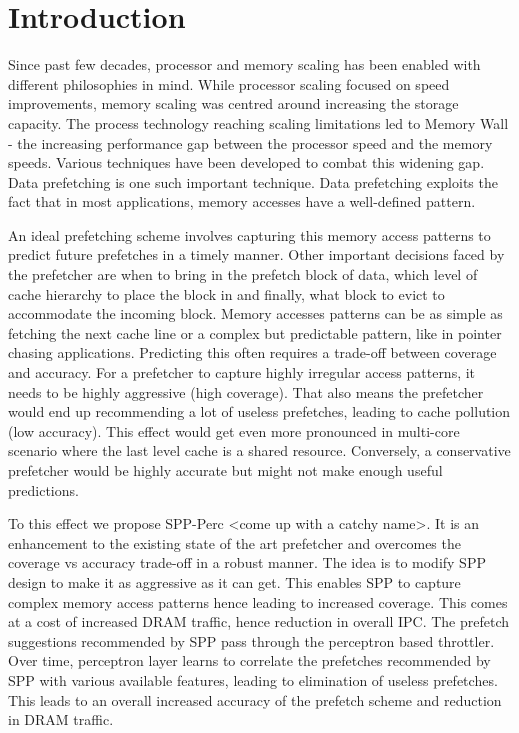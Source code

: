 \section{Introduction}
Since past few decades, processor and memory scaling has been enabled
with different philosophies in mind.  While processor scaling focused
on speed improvements, memory scaling was centred around increasing
the storage capacity.  The process technology reaching scaling
limitations led to Memory Wall\cite{MemWall} - the increasing
performance gap between the processor speed and the memory speeds.
Various techniques have been developed to combat this widening gap.
Data prefetching is one such important technique.  Data prefetching
exploits the fact that in most applications, memory accesses have a
well-defined pattern.

An ideal prefetching scheme involves capturing this memory access
patterns to predict future prefetches in a timely manner.  Other
important decisions faced by the prefetcher are when to bring in the
prefetch block of data, which level of cache hierarchy to place the
block in and finally, what block to evict to accommodate the incoming
block.  Memory accesses patterns can be as simple as fetching the next
cache line or a complex but predictable pattern, like in pointer
chasing applications.  Predicting this often requires a trade-off
between coverage and accuracy.  For a prefetcher to capture highly
irregular access patterns, it needs to be highly aggressive (high
coverage).  That also means the prefetcher would end up recommending a
lot of useless prefetches, leading to cache pollution (low accuracy).
This effect would get even more pronounced in multi-core scenario
where the last level cache is a shared resource.  Conversely, a
conservative prefetcher would be highly accurate but might not make
enough useful predictions.

To this effect we propose SPP-Perc <come up with a catchy name>.  It
is an enhancement to the existing state of the art prefetcher and
overcomes the coverage vs accuracy trade-off in a robust manner.  The
idea is to modify SPP design to make it as aggressive as it can get.
This enables SPP to capture complex memory access patterns hence
leading to increased coverage.  This comes at a cost of increased DRAM
traffic, hence reduction in overall IPC.  The prefetch suggestions
recommended by SPP pass through the perceptron based throttler.  Over
time, perceptron layer learns to correlate the prefetches recommended
by SPP with various available features, leading to elimination of
useless prefetches.  This leads to an overall increased accuracy of
the prefetch scheme and reduction in DRAM traffic.

